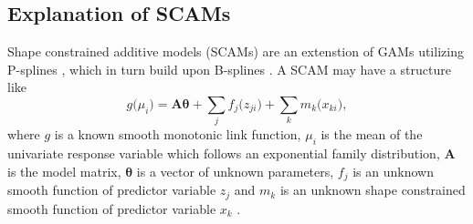 \subsection{Explanation of SCAMs}

Shape constrained additive models (SCAMs) \parencite{Pya2010,Pya2015} are an extenstion of GAMs utilizing P-splines \parencite{Eilers1996}, which in turn build upon B-splines \parencite{Boor2001}.  A SCAM may have a structure like
\begin{equation}
  \label{eq:SCAM}
  g\bigl(\mu_i\bigr) = \symbf{A} \symbf{\theta} + \sum_j f_j\bigl(z_{j i}\bigr) + \sum_k m_k\bigl(x_{k i}\bigr),
\end{equation}
where \(g\) is a known smooth monotonic link function, \(\mu_i\) is the mean of the univariate response variable which follows an exponential family distribution, \(\symbf{A}\) is the model matrix, \(\symbf{\theta}\) is a vector of unknown parameters, \(f_j\) is an unknown smooth function of predictor variable \(z_j\) and \(m_k\) is an unknown shape constrained smooth function of predictor variable \(x_k\) \parencite{Pya2015}.


